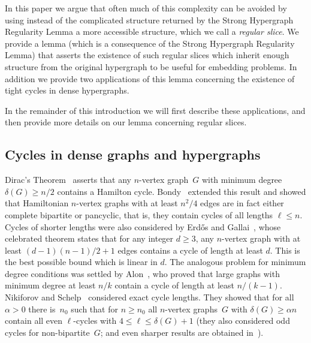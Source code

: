 \documentclass[12pt,a4paper]{amsart}
\begin{document}
In this paper we argue that often much of this complexity can be avoided by
using instead of the complicated structure returned by the Strong
Hypergraph Regularity Lemma a more accessible structure, which we call a
\emph{regular slice}. We provide a lemma (which is a consequence of the Strong
Hypergraph Regularity Lemma) that asserts the existence of such
regular slices which inherit enough structure from the original hypergraph
to be useful for embedding problems. In addition we provide two
applications of this lemma concerning the existence of tight cycles in
dense hypergraphs.

In the remainder of this introduction we will first describe these
applications, and then provide more details on our lemma concerning regular
slices.

\subsection{Cycles in dense graphs and hypergraphs}

Dirac's Theorem~\cite{Dirac} asserts that any $n$-vertex graph~$G$ with minimum degree 
$\delta(G)\ge n/2$ contains a Hamilton cycle. Bondy~\cite{Bondy} extended
this result and showed that Hamiltonian $n$-vertex graphs with at least
$n^2/4$ edges are in fact either complete bipartite or pancyclic, that is,
they contain cycles of all lengths $\ell\le n$.  Cycles of shorter lengths
were also considered by Erd\H{o}s and Gallai~\cite{ErdGal}, whose
celebrated theorem states that for any integer $d \geq 3$, any $n$-vertex
graph with at least $(d-1)(n-1)/2 + 1$ edges contains a cycle of length at
least $d$.  This is the best possible bound which is linear in $d$. The analogous
problem for minimum degree conditions was settled by
Alon~\cite{Alon}, who proved that large graphs with minimum degree at least $n/k$
contain a cycle of length at least $n/(k-1)$. Nikiforov and
Schelp~\cite{NikiSchelp} considered exact cycle lengths. They showed that
for all $\alpha>0$ there is~$n_0$ such that for $n\ge n_0$ all $n$-vertex
graphs~$G$ with $\delta(G)\ge\alpha n$ contain all even $\ell$-cycles with
$4\le \ell\le\delta(G)+1$ (they also considered odd cycles for
non-bipartite~$G$; and even sharper results are obtained in~\cite{Allen}).
\end{document}
